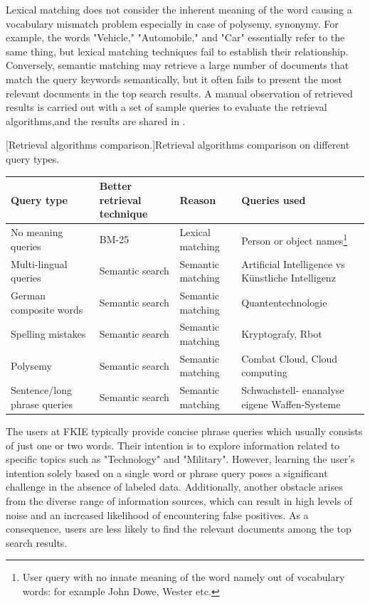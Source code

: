  Lexical matching does not consider the inherent meaning of the word causing a vocabulary mismatch problem especially in case of polysemy, synonymy. For example, the words "Vehicle," "Automobile," and "Car" essentially refer to the same thing, but lexical matching techniques fail to establish their relationship. Conversely, semantic matching may retrieve a large number of documents that match the query keywords semantically, but it often fails to present the most relevant documents in the top search results. A manual observation of retrieved results is carried out with a set of sample queries to evaluate the retrieval algorithms,and the results are shared in .



\begin{center}
	[Retrieval algorithms comparison.]{Retrieval algorithms comparison on different query types.}\label{tab:ir_system_comparison}
	\begin{tabularx}{.99\textwidth}{|Y|Y|Y|Y|}
		
		\hline
		  Query type & Better retrieval technique &  Reason &  Queries used  \\
		\hline
	 No meaning queries & BM-25 &  Lexical matching  & Person or object names\footnote{User query with no innate meaning of the word namely out of vocabulary words: for example John Dowe, Wester etc.} \\
		\hline
		 Multi-lingual queries & Semantic search &  Semantic matching & Artificial Intelligence vs Künstliche Intelligenz\\
		\hline
	 German composite words  & Semantic search&  Semantic matching & Quantentechnologie \\
		\hline
	 Spelling mistakes  &  Semantic search&  Semantic matching & Kryptografy, Rbot \\
		\hline
	 Polysemy  & Semantic search&  Semantic matching & Combat Cloud, Cloud computing \\
		\hline
	 Sentence/long phrase queries  & Semantic search&  Semantic matching  & Schwachstell-
		enanalyse eigene Waffen-Systeme \\
		\hline
		
	\end{tabularx}
\end{center}

The users at \ac{FKIE} typically provide concise phrase queries which usually consists of just one or two words. Their intention is to explore information related to specific topics such as "Technology" and "Military". However, learning the user's intention solely based on a single word or phrase query poses a significant challenge in the absence of labeled data. Additionally, another obstacle arises from the diverse range of information sources, which can result in high levels of noise and an increased likelihood of encountering false positives. As a consequence, users are less likely to find the relevant documents among the top search results. 


